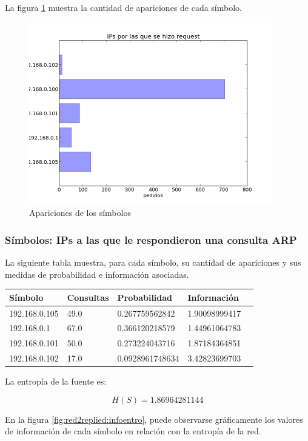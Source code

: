 \documentclass{article}
\begin{document}
La figura \ref{fig:red2requested:count} muestra la cantidad de apariciones de
cada símbolo.

\begin{figure}[h!]
    \centering
    \includegraphics[width=300pt]{red2/red2requested.png}
    \caption{Apariciones de los símbolos}
    \label{fig:red2requested:count}
\end{figure}

\newpage

\subsubsection{Símbolos: IPs a las que le respondieron una consulta ARP}
La siguiente tabla muestra, para cada símbolo, su cantidad de apariciones y
sus medidas de probabilidad e información asociadas.

\vskip10pt

\begin{tabular}{|l|l|l|l|l|}
  \hline
  Símbolo & Consultas & Probabilidad & Información \\
  \hline
  192.168.0.105 & 49.0 & 0.267759562842 & 1.90098999417\\
\hline
192.168.0.1 & 67.0 & 0.366120218579 & 1.44961064783\\
\hline
192.168.0.101 & 50.0 & 0.273224043716 & 1.87184364851\\
\hline
192.168.0.102 & 17.0 & 0.0928961748634 & 3.42823699703\\
\hline
\end{tabular}

\vskip10pt

La entropía de la fuente es:

$$H(S) = 1.86964281144$$

En la figura \ref{fig:red2replied:infoentro}, puede observarse gráficamente
los valores de información de cada símbolo en relación con la entropía de la
red.
\end{document}
